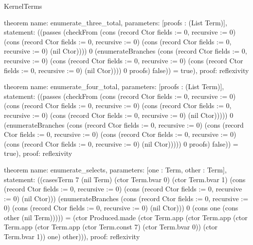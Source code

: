 \begin{lexlean}{KernelTerms}
\begin{semanticmodule}
theorem{
  name: enumerate_three_total,
  parameters: [proofs : (List Term)],
  statement: ((passes (checkFrom (cons (record Ctor {fields := 0, recursive := 0}) (cons (record Ctor {fields := 0, recursive := 0}) (cons (record Ctor {fields := 0, recursive := 0}) (nil Ctor)))) 0 (enumerateBranches (cons (record Ctor {fields := 0, recursive := 0}) (cons (record Ctor {fields := 0, recursive := 0}) (cons (record Ctor {fields := 0, recursive := 0}) (nil Ctor)))) 0 proofs) false)) = true),
  proof: reflexivity{}
}

theorem{
  name: enumerate_four_total,
  parameters: [proofs : (List Term)],
  statement: ((passes (checkFrom (cons (record Ctor {fields := 0, recursive := 0}) (cons (record Ctor {fields := 0, recursive := 0}) (cons (record Ctor {fields := 0, recursive := 0}) (cons (record Ctor {fields := 0, recursive := 0}) (nil Ctor))))) 0 (enumerateBranches (cons (record Ctor {fields := 0, recursive := 0}) (cons (record Ctor {fields := 0, recursive := 0}) (cons (record Ctor {fields := 0, recursive := 0}) (cons (record Ctor {fields := 0, recursive := 0}) (nil Ctor))))) 0 proofs) false)) = true),
  proof: reflexivity{}
}

theorem{
  name: enumerate_selects,
  parameters: [one : Term, other : Term],
  statement: ((casesTerm 7 (nil Term) (ctor Term.bvar 0) (ctor Term.bvar 1) (cons (record Ctor {fields := 0, recursive := 0}) (cons (record Ctor {fields := 0, recursive := 0}) (nil Ctor))) (enumerateBranches (cons (record Ctor {fields := 0, recursive := 0}) (cons (record Ctor {fields := 0, recursive := 0}) (nil Ctor))) 0 (cons one (cons other (nil Term))))) = (ctor Produced.made (ctor Term.app (ctor Term.app (ctor Term.app (ctor Term.app (ctor Term.const 7) (ctor Term.bvar 0)) (ctor Term.bvar 1)) one) other))),
  proof: reflexivity{}
}
\end{semanticmodule}
\end{lexlean}
